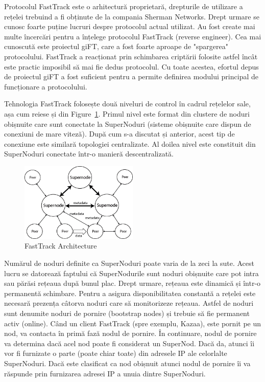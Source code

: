 Protocolul FastTrack este o arhitectură proprietară, drepturile de utilizare a
rețelei trebuind a fi obținute de la compania Sherman Networks. Drept urmare
se cunosc foarte puține lucruri despre protocolul actual utilizat. Au fost
create mai multe încercări pentru a înțelege protocolul FastTrack (reverse
engineer). Cea mai cunoscută este proiectul giFT, care a fost foarte aproape
de "spargerea" protocolului. FastTrack a reacționat prin schimbarea criptării
folosite astfel încât este practic imposibil să mai fie dedus protocolul. Cu
toate acestea, efortul depus de proiectul giFT a fost suficient pentru a
permite definirea modului principal de funcționare a protocolului.

Tehnologia FastTrack folosește două niveluri de control în cadrul rețelelor
sale, așa cum reiese și din Figure~\ref{fig:p2p-systems:fasttrack}. Primul
nivel este format din clustere de noduri obișnuite care sunt conectate la
SuperNoduri (sisteme obișnuite care dispun de conexiuni de mare viteză). După
cum s-a discutat și anterior, acest tip de conexiune este similară topologiei
centralizate. Al doilea nivel este constituit din SuperNoduri conectate într-o
manieră descentralizată.

\begin{figure}
  \centering
  \includegraphics[width=0.5\textwidth]{src/img/p2p-systems/fasttrack}
  \caption{FastTrack Architecture}
  \label{fig:p2p-systems:fasttrack}
\end{figure}

Numărul de noduri definite ca SuperNoduri poate varia de la zeci la sute.
Acest lucru se datorează faptului că SuperNodurile sunt noduri obișnuite care
pot intra sau părăsi rețeaua după bunul plac. Drept urmare, rețeaua este
dinamică și într-o permanentă schimbare. Pentru a asigura disponibilitatea
constantă a rețelei este necesară prezența câtorva noduri care să monitorizeze
rețeaua. Astfel de noduri sunt denumite noduri de pornire (bootstrap nodes) și
trebuie să fie permanent activ (online). Când un client FastTrack (spre
exemplu, Kazaa), este pornit pe un nod, va contacta în primă fază nodul de
pornire. În continuare, nodul de pornire va determina dacă acel nod poate fi
considerat un SuperNod. Dacă da, atunci îi vor fi furnizate o parte (poate
chiar toate) din adresele IP ale celorlalte SuperNoduri. Dacă este clasificat
ca nod obișnuit atunci nodul de pornire îi va răspunde prin furnizarea adresei
IP a unuia dintre SuperNoduri.

